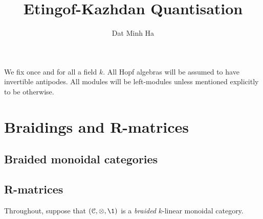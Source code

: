 

\setcounter{section}{-1}





    \title{Etingof-Kazhdan Quantisation}
    
    \author{Dat Minh Ha}
    \maketitle
    
    \begin{abstract}
    
    \end{abstract}
    
    {
    \hypersetup{} 
    \tableofcontents %
    }

    \begin{convention}
        We fix once and for all a field $k$. All Hopf algebras will be assumed to have invertible antipodes. All modules will be left-modules unless mentioned explicitly to be otherwise.
    \end{convention}
    
    \section{Braidings and R-matrices}
        \subsection{Braided monoidal categories}
    
        \subsection{R-matrices}
            \begin{convention}
                Throughout, suppose that $(\C, \tensor, \1)$ is a \textit{braided} $k$-linear monoidal category.
            \end{convention}
        
